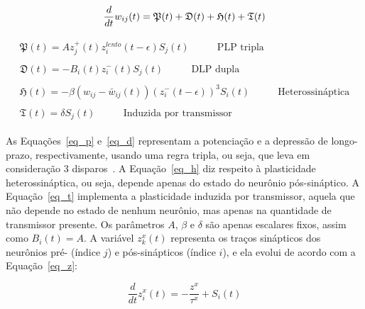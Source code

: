 \begin{samepage}

\begin{equation}
\label{eq_pdtd}
\frac{d}{dt}w_{ij}(t) = \mathfrak{P}(t) + \mathfrak{D}(t) + \mathfrak{H}(t) + \mathfrak{T}(t)\\
\end{equation}

\begin{align}
\begin{split}\label{eq_p}
  \mathfrak{P}(t) = Az_j^+(t) z_i^{lento}(t - \epsilon)S_j(t){} & \quad\quad\text{PLP tripla}
\end{split}\\
\begin{split}\label{eq_d}
  \mathfrak{D}(t) = - B_i(t)z_i^- (t)S_j(t){} & \quad\quad\text{DLP dupla}
\end{split}\\
\begin{split}\label{eq_h}
  \mathfrak{H}(t) = - \beta (w_{ij} - \bar{w}_{ij}(t)) (z_i^- (t - \epsilon))^3 S_i(t){} & \quad\quad\text{Heterossináptica}
\end{split}\\
\begin{split}\label{eq_t}
  \mathfrak{T}(t) = \delta S_j(t){} & \quad\quad\text{Induzida por transmissor}
\end{split}
\end{align}

\end{samepage}

As Equações~\ref{eq_p} e~\ref{eq_d} representam a potenciação e a depressão de longo-prazo, respectivamente, usando uma regra
tripla, ou seja, que leva em consideração 3 disparos~\cite{pfisterTriplets2006}. A Equação~\ref{eq_h} diz respeito à plasticidade
heterossináptica, ou seja, depende apenas do estado do neurônio pós-sináptico. A Equação~\ref{eq_t} implementa a plasticidade
induzida por transmissor, aquela que não depende no estado de nenhum neurônio, mas apenas na quantidade de transmissor presente.
Os parâmetros $A$, $\beta$ e $\delta$ são apenas escalares fixos, assim como $B_i(t)=A$. A variável $z_k^x(t)$ representa os
traços sinápticos dos neurônios pré- (índice $j$) e pós-sinápticos (índice $i$), e ela evolui de acordo com a Equação~\ref{eq_z}:

\begin{equation}
\label{eq_z}
\frac{d}{dt}z_i^x(t) = - \frac{z^x}{\tau^x}+S_i(t)
\end{equation}

